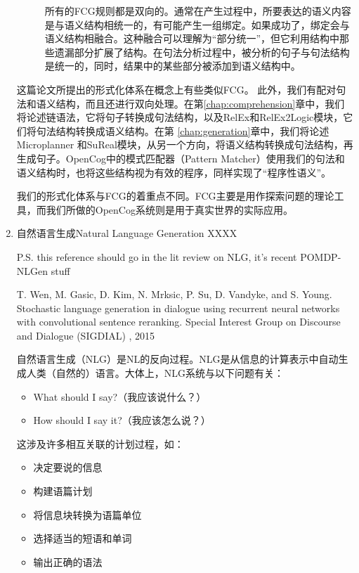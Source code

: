 \begin{enumerate}
\begin{description}
所有的FCG规则都是双向的。通常在产生过程中，所要表达的语义内容是与语义结构相统一的，有可能产生一组绑定。如果成功了，绑定会与语义结构相融合。这种融合可以理解为“部分统一”，但它利用结构中那些遗漏部分扩展了结构。在句法分析过程中，被分析的句子与句法结构是统一的，同时，结果中的某些部分被添加到语义结构中。
\end{description}

这篇论文所提出的形式化体系在概念上有些类似FCG。 此外，我们有配对句法和语义结构，而且还进行双向处理。在第\ref{chap:comprehension}章中，我们将论述链语法，它将句子转换成句法结构，以及RelEx和RelEx2Logic模块，它们将句法结构转换成语义结构。在第 \ref{chap:generation}章中，我们将论述Microplanner 和SuReal模块，从另一个方向，将语义结构转换成句法结构，再生成句子。OpenCog中的模式匹配器（Pattern Matcher）使用我们的句法和语义结构时，也将这些结构视为有效的程序，同样实现了“程序性语义”。

我们的形式化体系与FCG的着重点不同。FCG主要是用作探索问题的理论工具，而我们所做的OpenCog系统则是用于真实世界的实际应用。

\item{自然语言生成}{Natural Language Generation}
XXXX


P.S. this reference should go in the lit review on NLG, it's recent POMDP-NLGen stuff

T. Wen, M. Gasic, D. Kim, N. Mrksic, P. Su, D. Vandyke, and S. Young. Stochastic language generation in dialogue using
recurrent neural networks with convolutional sentence reranking.
Special Interest Group on Discourse and Dialogue
(SIGDIAL)
, 2015

自然语言生成（NLG）是NL的反向过程。NLG是从信息的计算表示中自动生成人类（自然的）语言。大体上，NLG系统与以下问题有关：

\begin{itemize}
\item What should I say?（我应该说什么？）
\item How should I say it?（我应该怎么说？）
\end{itemize}

这涉及许多相互关联的计划过程，如：
\begin{itemize}
\item 决定要说的信息
\item 构建语篇计划
\item 将信息块转换为语篇单位
\item 选择适当的短语和单词
\item 输出正确的语法
\end{itemize}


\end{enumerate}

